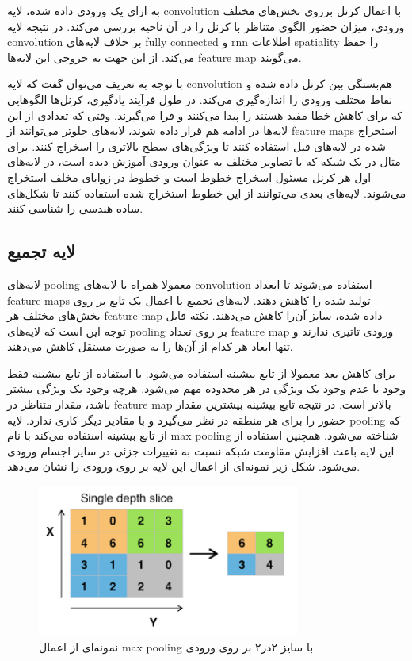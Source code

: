 به ازای یک ورودی داده شده، لایه \gls{convolution} با اعمال کرنل برروی بخش‌های
مختلف ورودی، میزان حضور الگوی متناظر با کرنل را در آن ناحیه بررسی می‌کند. در
نتیجه لایه \gls{convolution} بر خلاف لایه‌های \gls{fully connected} و \gls{rnn}
اطلاعات \gls{spatiality} را حفظ می‌کند. از این جهت به خروجی این لایه‌ها
\gls{feature map} می‌گویند.

با توجه به تعریف می‌توان گفت که لایه \gls{convolution} هم‌بستگی بین کرنل داده
شده و نقاط مختلف ورودی را اندازه‌گیری می‌کند. در طول فرآیند یادگیری، کرنل‌ها
الگوهایی که برای کاهش خطا مفید هستند را پیدا می‌کنند و فرا می‌گیرند. وقتی که
تعدادی از این لایه‌ها در ادامه هم قرار داده شوند، لایه‌های جلوتر می‌توانند از
\glspl{feature map} استخراج شده در لایه‌های قبل استفاده کنند تا ویژگی‌های سطح
بالاتری را اسخراج کنند. برای مثال در یک شبکه که با تصاویر مختلف به عنوان ورودی
آموزش دیده است، در لایه‌های اول هر کرنل مسئول اسخراج خطوط است و خطوط در زوایای
مخلف استخراج می‌شوند. لایه‌های بعدی می‌توانند از این خطوط استخراج شده استفاده
کنند تا شکل‌های ساده هندسی را شناسی کنند.

\subsection{لایه تجمیع}
لایه‌های \gls{pooling} معمولا همراه با لایه‌های \gls{convolution} استفاده
می‌شوند تا ابعداد \glspl{feature map} تولید شده را کاهش دهند. لایه‌های تجمیع با
اعمال یک تابع بر روی بخش‌های مختلف هر \gls{feature map} داده شده، سایز آن‌را
کاهش می‌دهند. نکته قابل توجه این است که لایه‌های \gls{pooling} بر روی تعداد
\gls{feature map} ورودی تاثیری ندارند و تنها ابعاد هر کدام از آن‌ها را به صورت
مستقل کاهش می‌دهند.

برای کاهش بعد معمولا از تابع بیشینه استفاده می‌شود. با استفاده از تابع بیشینه
فقط وجود یا عدم وجود یک ویژگی در هر محدوده مهم می‌شود. هرچه وجود یک ویژگی بیشتر
باشد، مقدار متناظر در \gls{feature map} بالاتر است. در نتیجه تابع بیشینه بیشترین
مقدار حضور را برای هر منطقه در نظر می‌گیرد و با مقادیر دیگر کاری ندارد. لایه
\gls{pooling} که از تابع بیشینه استفاده می‌کند با نام \gls{max pooling} شناخته
می‌شود. همچنین استفاده از این لایه باعث افزایش مقاومت شبکه نسبت به تغییرات جزئی
در سایز اجسام ورودی می‌شود. شکل زیر نمونه‌ای از اعمال این لایه بر روی ورودی را
نشان می‌دهد.
\begin{figure}[ht]
    \centering
    \includegraphics[height=5cm]{./statics/max_pooling.png}
    \caption{نمونه‌ای از اعمال \gls{max pooling} با سایز ۲در۲ بر روی ورودی}
\end{figure}


